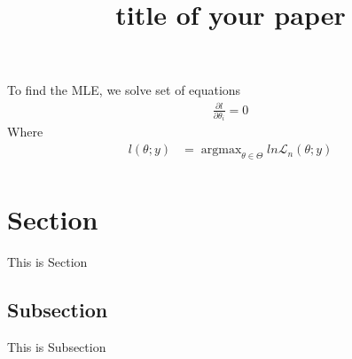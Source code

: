 \documentclass[10pt, a4paper, titlepage]{article}
\title{title of your paper}
\date{}
\begin{document}
\newpage
To find the MLE, we solve set of equations
\begin{align*}
\frac{\partial l}{\partial \theta_i} = 0
\end{align*}
Where
\begin{align*}
l(\theta;y) &= \mathop{argmax}_{\theta \in \Theta}ln\mathcal{L}_n(\theta;y) \\
\end{align*}

\section{Section}
This is Section
\subsection{Subsection}
This is Subsection

\newpage
{}
\end{document}
